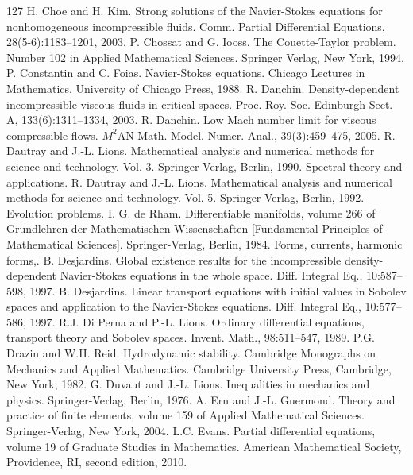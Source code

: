 \begin{thebibliography}{127}
 H. Choe and H. Kim. Strong solutions of the Navier-Stokes equations for nonhomogeneous incompressible fluids. Comm. Partial Differential Equations, 28(5-6):1183–1201, 2003.
 P. Chossat and G. Iooss. The Couette-Taylor problem. Number 102 in Applied Mathematical Sciences. Springer Verlag, New York, 1994.
 P. Constantin and C. Foias. Navier-Stokes equations. Chicago Lectures in Mathematics. University of Chicago Press, 1988.
 R. Danchin. Density-dependent incompressible viscous fluids in critical spaces. Proc. Roy. Soc. Edinburgh Sect. A, 133(6):1311–1334, 2003.
 R. Danchin. Low Mach number limit for viscous compressible flows. $M^2$AN Math. Model. Numer. Anal., 39(3):459–475, 2005.
 R. Dautray and J.-L. Lions. Mathematical analysis and numerical methods for science and technology. Vol. 3. Springer-Verlag, Berlin, 1990. Spectral theory and applications.
 R. Dautray and J.-L. Lions. Mathematical analysis and numerical methods for science and technology. Vol. 5. Springer-Verlag, Berlin, 1992. Evolution problems. I.
 G. de Rham. Differentiable manifolds, volume 266 of Grundlehren der Mathematischen Wissenschaften [Fundamental Principles of Mathematical Sciences]. Springer-Verlag, Berlin, 1984. Forms, currents, harmonic forms,.
 B. Desjardins. Global existence results for the incompressible density-dependent Navier-Stokes equations in the whole space. Diff. Integral Eq., 10:587–598, 1997.
 B. Desjardins. Linear transport equations with initial values in Sobolev spaces and application to the Navier-Stokes equations. Diff. Integral Eq., 10:577–586, 1997.
 R.J. Di Perna and P.-L. Lions. Ordinary differential equations, transport theory and Sobolev spaces. Invent. Math., 98:511–547, 1989.
 P.G. Drazin and W.H. Reid. Hydrodynamic stability. Cambridge Monographs on Mechanics and Applied Mathematics. Cambridge University Press, Cambridge, New York, 1982.
 G. Duvaut and J.-L. Lions. Inequalities in mechanics and physics. Springer-Verlag, Berlin, 1976.
 A. Ern and J.-L. Guermond. Theory and practice of finite elements, volume 159 of Applied Mathematical Sciences. Springer-Verlag, New York, 2004.
 L.C. Evans. Partial differential equations, volume 19 of Graduate Studies in Mathematics. American Mathematical Society, Providence, RI, second edition, 2010.

\end{thebibliography}
